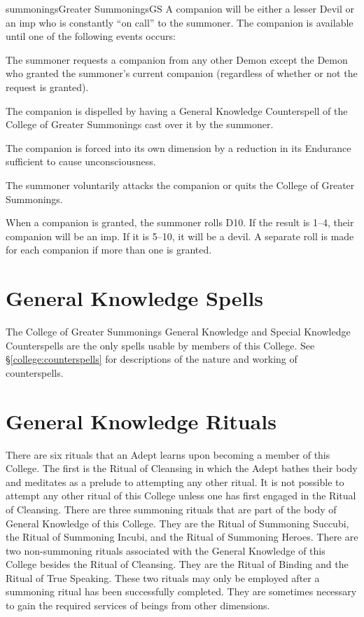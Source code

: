 \begin{College}[1.0]{summonings}{Greater Summonings}{GS}
A companion will be either a lesser Devil or an imp who is constantly
“on call” to the summoner.  The companion is available until one of
the following events occurs:

\begin{Enumerate}
\item The summoner requests a companion from any other Demon except
  the Demon who granted the summoner’s current companion (regardless
  of whether or not the request is granted).
\item The companion is dispelled by having a General Knowledge
  Counterspell of the College of Greater Summonings cast over it by
  the summoner.
\item The companion is forced into its own dimension by a reduction in
  its Endurance sufficient to cause unconsciousness.
\item The summoner voluntarily attacks the companion or quits the
  College of Greater Summonings.
\end{Enumerate}

When a companion is granted, the summoner rolls D10.  If the result is
1--4, their companion will be an imp. If it is 5--10, it will be a
devil. A separate roll is made for each companion if more than one is
granted.

\section{General Knowledge Spells}

The College of Greater Summonings General Knowledge and Special
Knowledge Counterspells are the only spells usable by members of this
College.  See \S\ref{college:counterspells} for descriptions of the
nature and working of counterspells.

\section{General Knowledge Rituals}

There are six rituals that an Adept learns upon becoming a member of
this College. The first is the Ritual of Cleansing in which the Adept
bathes their body and meditates as a prelude to attempting any other
ritual.  It is not possible to attempt any other ritual of this
College unless one has first engaged in the Ritual of Cleansing.
There are three summoning rituals that are part of the body of General
Knowledge of this College. They are the Ritual of Summoning Succubi,
the Ritual of Summoning Incubi, and the Ritual of Summoning Heroes.
There are two non-summoning rituals associated with the General
Knowledge of this College besides the Ritual of Cleansing.  They are
the Ritual of Binding and the Ritual of True Speaking. These two
rituals may only be employed after a summoning ritual has been
successfully completed.  They are sometimes necessary to gain the
required services of beings from other dimensions.


\end{College}
